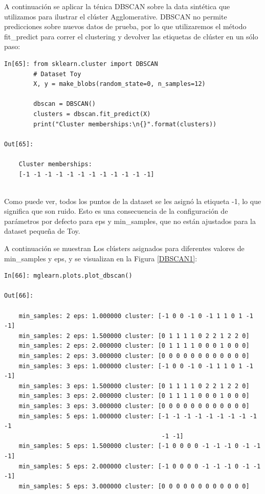 A continuación se aplicar la ténica DBSCAN sobre la data sintética que utilizamos para ilustrar el clúster Agglomerative.  DBSCAN no permite predicciones sobre nuevos datos de prueba, por lo que utilizaremos el método {\ttfamily fit\_predict} para correr el clustering  y  devolver las etiquetas de clúster en un sólo paso:\\ 

\begin{lstlisting} 
In[65]: from sklearn.cluster import DBSCAN
        # Dataset Toy
        X, y = make_blobs(random_state=0, n_samples=12)  
   
        dbscan = DBSCAN()
        clusters = dbscan.fit_predict(X)
        print("Cluster memberships:\n{}".format(clusters))

Out[65]:
    
    Cluster memberships:
    [-1 -1 -1 -1 -1 -1 -1 -1 -1 -1 -1 -1]


\end{lstlisting}  %



Como puede ver,  todos los puntos de la dataset   se les asignó la etiqueta -1,  lo que significa que son   ruido.  Esto es una consecuencia de la configuración de parámetros por defecto para  {\ttfamily eps} y
 {\ttfamily min\_samples}, que no están ajustados  para la dataset  pequeña de Toy. 

A continuación se  muestran Los clústers asignados  para diferentes valores de {\ttfamily min\_samples} y  {\ttfamily eps}, y se visualizan en la Figura \ref{DBSCAN1}:\\ 

\begin{lstlisting}  
In[66]: mglearn.plots.plot_dbscan()

Out[66]:
   
    min_samples: 2 eps: 1.000000 cluster: [-1 0 0 -1 0 -1 1 1 0 1 -1 -1]
    min_samples: 2 eps: 1.500000 cluster: [0 1 1 1 1 0 2 2 1 2 2 0]
    min_samples: 2 eps: 2.000000 cluster: [0 1 1 1 1 0 0 0 1 0 0 0]
    min_samples: 2 eps: 3.000000 cluster: [0 0 0 0 0 0 0 0 0 0 0 0]
    min_samples: 3 eps: 1.000000 cluster: [-1 0 0 -1 0 -1 1 1 0 1 -1 -1]
    min_samples: 3 eps: 1.500000 cluster: [0 1 1 1 1 0 2 2 1 2 2 0]
    min_samples: 3 eps: 2.000000 cluster: [0 1 1 1 1 0 0 0 1 0 0 0]
    min_samples: 3 eps: 3.000000 cluster: [0 0 0 0 0 0 0 0 0 0 0 0]
    min_samples: 5 eps: 1.000000 cluster: [-1 -1 -1 -1 -1 -1 -1 -1 -1 -1
                                           -1 -1]
    min_samples: 5 eps: 1.500000 cluster: [-1 0 0 0 0 -1 -1 -1 0 -1 -1 -1]
    min_samples: 5 eps: 2.000000 cluster: [-1 0 0 0 0 -1 -1 -1 0 -1 -1 -1]
    min_samples: 5 eps: 3.000000 cluster: [0 0 0 0 0 0 0 0 0 0 0 0]

\end{lstlisting} 


